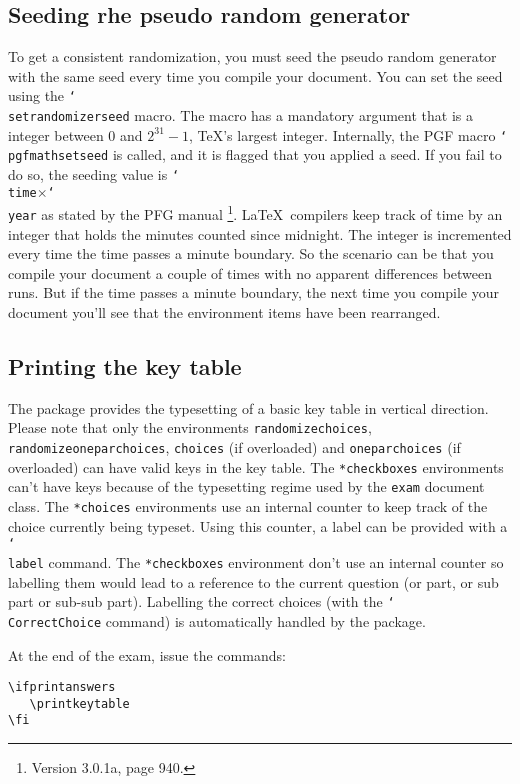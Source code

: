 \documentclass[12pt,a4paper]{exam}
\providecommand{\texorpdfstring}[2]{#1}
\newcommand{\bs}{\texorpdfstring{\char`\\}{}}
\begin{document}
\subsection{Seeding rhe pseudo random generator}
\label{sec:seeding}
To get a consistent randomization, you must seed the pseudo random generator
with the same seed every time you compile your document. You can set the
seed using the \texttt{\bs setrandomizerseed} macro. The macro has a mandatory
argument that is a integer between 0 and $2^{31}-1$, \TeX's largest integer.
Internally, the PGF macro \texttt{\bs pgfmathsetseed} is called, and it is
flagged that you applied a seed. If you fail to do so, the seeding value is
\texttt{\bs time}$\times$\texttt{\bs year} as stated by the PFG manual%
\footnote{Version 3.0.1a, page 940.}. \LaTeX\ compilers keep track of
time by an integer that holds the minutes counted since midnight. The integer is
incremented every time the time passes a minute boundary. So the scenario
can be that you compile your document a couple of times with no apparent
differences between runs. But if the time passes a minute boundary, the
next time you compile your document you'll see that the environment items
have been rearranged.



\subsection{Printing the key table}
The package provides the typesetting of a basic key table in vertical direction.
Please note that only the environments \texttt{randomizechoices},
\texttt{randomizeoneparchoices}, \texttt{choices} (if overloaded) and
\texttt{oneparchoices} (if overloaded) can have valid keys in the key table.
The \texttt{*checkboxes} environments can't 
have keys because of the typesetting regime used by the \texttt{exam}
document class. The \texttt{*choices} environments use an internal counter
to keep track of the choice currently being typeset. Using this counter, a
label can be provided with a \texttt{\bs label} command.
The \texttt{*checkboxes} environment don't use an internal counter so 
labelling them would lead to a reference to the current question (or part,
or sub part or sub-sub part). Labelling the correct choices (with the
\texttt{\bs CorrectChoice} command) is automatically handled by the
package.

At the end of the exam, issue the commands:

\begin{lstlisting}
\ifprintanswers
   \printkeytable
\fi
\end{lstlisting}
\end{document}
